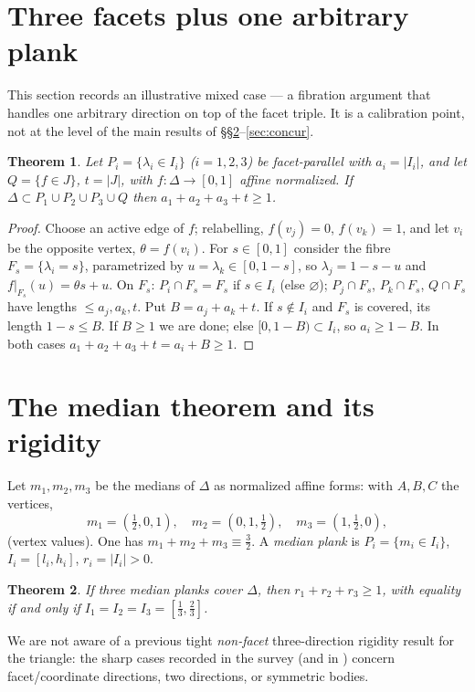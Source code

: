 \documentclass[11pt,reqno]{amsart}
\theoremstyle{plain}
\newtheorem{theorem}{Theorem}[section]
\theoremstyle{definition}
\theoremstyle{remark}
\begin{document}
\section{Three facets plus one arbitrary plank}\label{sec:3plus1}
This section records an illustrative mixed case --- a fibration argument that
handles one arbitrary direction on top of the facet triple. It is a
calibration point, not at the level of the main results of
\S\S\ref{sec:median}--\ref{sec:concur}.
\begin{theorem}\label{thm:3plus1}
Let $P_i=\{\lambda_i\in I_i\}$ ($i=1,2,3$) be facet-parallel with $a_i=|I_i|$, and
let $Q=\{f\in J\}$, $t=|J|$, with $f:\Delta\to[0,1]$ affine normalized. If
$\Delta\subset P_1\cup P_2\cup P_3\cup Q$ then $a_1+a_2+a_3+t\ge1$.
\end{theorem}
\begin{proof}
Choose an active edge of $f$; relabelling, $f(v_j)=0$, $f(v_k)=1$, and let $v_i$ be
the opposite vertex, $\theta=f(v_i)$. For $s\in[0,1]$ consider the fibre
$F_s=\{\lambda_i=s\}$, parametrized by $u=\lambda_k\in[0,1-s]$, so
$\lambda_j=1-s-u$ and $f|_{F_s}(u)=\theta s+u$. On $F_s$: $P_i\cap F_s=F_s$ if
$s\in I_i$ (else $\varnothing$); $P_j\cap F_s$, $P_k\cap F_s$, $Q\cap F_s$ have
lengths $\le a_j,a_k,t$. Put $B=a_j+a_k+t$. If $s\notin I_i$ and $F_s$ is covered,
its length $1-s\le B$. If $B\ge1$ we are done; else $[0,1-B)\subset I_i$, so
$a_i\ge1-B$. In both cases $a_1+a_2+a_3+t=a_i+B\ge1$.
\end{proof}

\section{The median theorem and its rigidity}\label{sec:median}
Let $m_1,m_2,m_3$ be the medians of $\Delta$ as normalized affine forms: with
$A,B,C$ the vertices,
\[ m_1=(\tfrac12,0,1),\quad m_2=(0,1,\tfrac12),\quad m_3=(1,\tfrac12,0), \]
(vertex values). One has $m_1+m_2+m_3\equiv\tfrac32$. A \emph{median plank} is
$P_i=\{m_i\in I_i\}$, $I_i=[l_i,h_i]$, $r_i=|I_i|>0$.
\begin{theorem}\label{thm:median}
If three median planks cover $\Delta$, then $r_1+r_2+r_3\ge1$, with equality if and
only if $I_1=I_2=I_3=[\tfrac13,\tfrac23]$.
\end{theorem}
We are not aware of a previous tight \emph{non-facet} three-direction rigidity
result for the triangle: the sharp cases recorded in the survey
\cite{Verreault} (and in \cite{Gardner88,BY26}) concern facet/coordinate directions,
two directions, or symmetric bodies.
\end{document}

